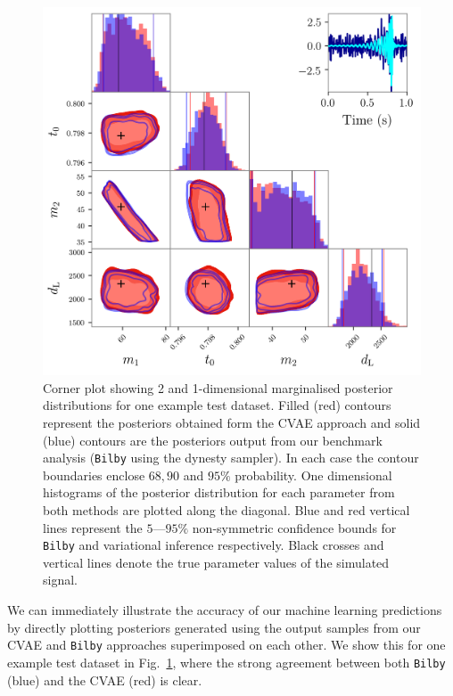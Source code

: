 \documentclass[%
showpacs,
 amsmath,amssymb,
 aps,
 twocolumn,
 prl,
 reprint,
floatfix,
]{revtex4-1}
\begin{document}
%
%
\begin{figure}
    \includegraphics[width=\textwidth]{images/corner_testcase0.png}
    \caption{\label{fig:corner_plot} Corner plot showing 2 and 1-dimensional
marginalised posterior distributions for one example test dataset. Filled (red)
contours represent the posteriors obtained form the \ac{CVAE} approach and
solid (blue) contours are the posteriors output from our benchmark analysis
(\texttt{Bilby} using the dynesty sampler). In each case the contour boundaries
enclose $68,90$ and $95\%$ probability. One dimensional histograms of the
posterior distribution for each parameter from both methods are plotted along
the diagonal. Blue and red vertical lines represent the $5$---$95\%$
non-symmetric confidence bounds for \texttt{Bilby} and variational inference
respectively. Black crosses and vertical lines denote the true parameter values
of the simulated signal.
} %
\end{figure}

%
%
We can immediately illustrate the accuracy of our machine learning predictions
by directly plotting posteriors generated using the output samples from our
\ac{CVAE} and \texttt{Bilby} approaches superimposed on each other. We show
this for one example test dataset in Fig.~\ref{fig:corner_plot}, where the
strong agreement between both \texttt{Bilby} (blue) and the \ac{CVAE} (red) is
clear. 
\end{document}
